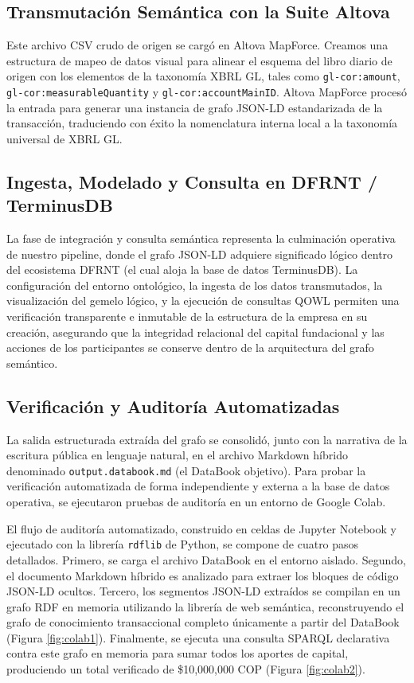 \documentclass[12pt, a4paper]{article}
\begin{document}
\subsection{Transmutación Semántica con la Suite Altova}
Este archivo CSV crudo de origen se cargó en Altova MapForce. Creamos una estructura de mapeo de datos visual para alinear el esquema del libro diario de origen con los elementos de la taxonomía XBRL GL, tales como \texttt{gl-cor:amount}, \texttt{gl-cor:measurableQuantity} y \texttt{gl-cor:accountMainID}. Altova MapForce procesó la entrada para generar una instancia de grafo JSON-LD estandarizada de la transacción, traduciendo con éxito la nomenclatura interna local a la taxonomía universal de XBRL GL.

\subsection{Ingesta, Modelado y Consulta en DFRNT / TerminusDB}
La fase de integración y consulta semántica representa la culminación operativa de nuestro pipeline, donde el grafo JSON-LD adquiere significado lógico dentro del ecosistema DFRNT (el cual aloja la base de datos TerminusDB). La configuración del entorno ontológico, la ingesta de los datos transmutados, la visualización del gemelo lógico, y la ejecución de consultas QOWL permiten una verificación transparente e inmutable de la estructura de la empresa en su creación, asegurando que la integridad relacional del capital fundacional y las acciones de los participantes se conserve dentro de la arquitectura del grafo semántico.

\subsection{Verificación y Auditoría Automatizadas}
La salida estructurada extraída del grafo se consolidó, junto con la narrativa de la escritura pública en lenguaje natural, en el archivo Markdown híbrido denominado \texttt{output.databook.md} (el DataBook objetivo). Para probar la verificación automatizada de forma independiente y externa a la base de datos operativa, se ejecutaron pruebas de auditoría en un entorno de Google Colab.

El flujo de auditoría automatizado, construido en celdas de Jupyter Notebook y ejecutado con la librería \texttt{rdflib} de Python, se compone de cuatro pasos detallados. Primero, se carga el archivo DataBook en el entorno aislado. Segundo, el documento Markdown híbrido es analizado para extraer los bloques de código JSON-LD ocultos. Tercero, los segmentos JSON-LD extraídos se compilan en un grafo RDF en memoria utilizando la librería de web semántica, reconstruyendo el grafo de conocimiento transaccional completo únicamente a partir del DataBook (Figura \ref{fig:colab1}). Finalmente, se ejecuta una consulta SPARQL declarativa contra este grafo en memoria para sumar todos los aportes de capital, produciendo un total verificado de \$10,000,000 COP (Figura \ref{fig:colab2}).
\end{document}
